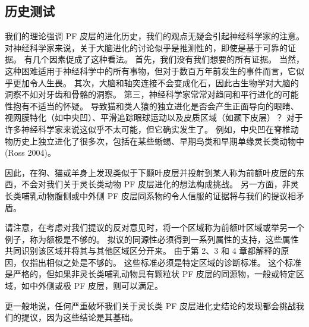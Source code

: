 \subsection{历史测试}
我们的理论强调 PF 皮层的进化历史，我们的观点无疑会引起神经科学家的注意。 对神经科学家来说，关于大脑进化的讨论似乎是推测性的，即使是基于可靠的证据。 有几个因素促成了这种看法。 首先，我们没有我们想要的所有证据。 当然，这种困难适用于神经科学中的所有事物，但对于数百万年前发生的事件而言，它似乎更加令人生畏。 其次，大脑和轴突连接不会变成化石，因此古生物学对大脑的洞察不如对牙齿和骨骼的洞察。 第三，神经科学家常常对趋同和平行进化的可能性抱有不适当的怀疑。 导致猫和类人猿的独立进化是否会产生正面导向的眼睛、视网膜特化（如中央凹）、平滑追踪眼球运动以及皮质区域（如颞下皮层）？ 对于许多神经科学家来说这似乎不太可能，但它确实发生了。 例如，中央凹在脊椎动物历史上独立进化了很多次，包括在某些蜥蜴、早期鸟类和早期单缘灵长类动物中 (Ross 2004)。
\par 
因此，在狗、猫或羊身上发现类似于下颞叶皮层并投射到某人称为前额叶皮层的东西，不会对我们关于灵长类动物 PF 皮层进化的想法构成挑战。 另一方面，非灵长类哺乳动物腹侧或中外侧 PF 皮层同系物的令人信服的证据将与我们的提议相矛盾。
\par 
请注意，在考虑对我们提议的反对意见时，将一个区域称为前额叶区域或举另一个例子，称为额极是不够的。 拟议的同源性必须得到一系列属性的支持，这些属性共同识别该区域并将其与其他区域区分开来。 由于第 2、3 和 4 章都解释的原因，仅指出相似之处是不够的。 这些标准必须是特定区域的诊断标准。 这个标准是严格的，但如果非灵长类哺乳动物具有颗粒状 PF 皮层的同源物，一般或特定区域，如中外侧或极 PF 皮层，则可以满足。
\par 
更一般地说，任何严重破坏我们关于灵长类 PF 皮层进化史结论的发现都会挑战我们的提议，因为这些结论是其基础。
